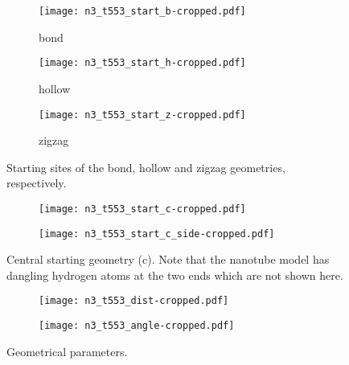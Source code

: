 \def\bfig#1#2{\expandafter\gdef\csname fig-#1\endcsname{\begin{figure}[ht]#2\label{#1}\end{figure}}}
\def\fref#1{\csname fig-#1\endcsname\Cref{#1}}

\bfig{fig:n3t553_start_sites}{
    \centering
    \begin{subfigure}{3cm}
        \texttt{[image: n3\_t553\_start\_b-cropped.pdf]}
        \caption{bond}
    \end{subfigure}
    \hspace{1cm}
    \begin{subfigure}{3cm}
        \texttt{[image: n3\_t553\_start\_h-cropped.pdf]}
        \caption{hollow}
    \end{subfigure}
    \hspace{1cm}
    \begin{subfigure}{3cm}
        \texttt{[image: n3\_t553\_start\_z-cropped.pdf]}
        \caption{zigzag}
    \end{subfigure}
    \caption{Starting sites of the bond, hollow and zigzag geometries, respectively.}
}

\bfig{fig:n3t553_start_center}{
    \centering
    \begin{subfigure}{3cm}
        \texttt{[image: n3\_t553\_start\_c-cropped.pdf]}
    \end{subfigure}
    \hspace{1cm}
    \begin{subfigure}{3cm}
        \texttt{[image: n3\_t553\_start\_c\_side-cropped.pdf]}
    \end{subfigure}
    \caption{Central starting geometry (c). Note that the nanotube model has dangling hydrogen atoms at the two ends which are not shown here.}
}

\bfig{fig:n3t553_geom_parms}{
    \centering
    \begin{subfigure}{4.7cm}
        \texttt{[image: n3\_t553\_dist-cropped.pdf]}
    \end{subfigure}
    \hspace{1cm}
    \begin{subfigure}{4cm}
        \texttt{[image: n3\_t553\_angle-cropped.pdf]}
    \end{subfigure}
    \caption{Geometrical parameters.}
}
